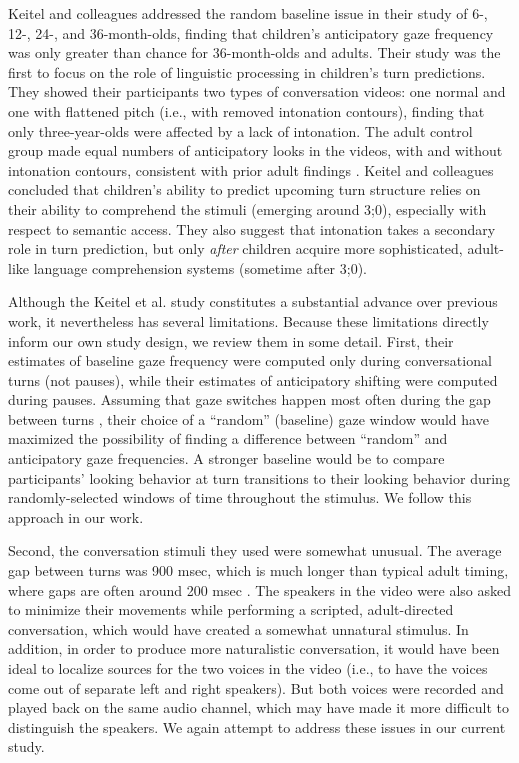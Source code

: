 \documentclass[authoryear, 12pt]{elsarticle}
\begin{document}
Keitel and colleagues \citeyearpar{keitel2013} addressed the random baseline issue in their study of 6-, 12-, 24-, and 36-month-olds, finding that children's anticipatory gaze frequency was only greater than chance for 36-month-olds and adults. Their study was the first to focus on the role of linguistic processing in children's turn predictions. They showed their participants two types of conversation videos: one normal and one with flattened pitch (i.e., with removed intonation contours), finding that only three-year-olds were affected by a lack of intonation. The adult control group made equal numbers of anticipatory looks in the videos, with and without intonation contours, consistent with prior adult findings \citep{de-ruiter2006}. Keitel and colleagues concluded that children's ability to predict upcoming turn structure relies on their ability to comprehend the stimuli (emerging around 3;0), especially with respect to semantic access. They also suggest that intonation takes a secondary role in turn prediction, but only \textit{after} children acquire more sophisticated, adult-like language comprehension systems (sometime after 3;0).

Although the Keitel et al. \citeyearpar{keitel2013} study constitutes a substantial advance over previous work, it nevertheless has several limitations. Because these limitations directly inform our own study design, we review them in some detail. First, their estimates of baseline gaze frequency were computed only during conversational turns (not pauses), while their estimates of anticipatory shifting were computed during pauses. Assuming that gaze switches happen most often during the gap between turns \citep{hirvenkari2013}, their choice of a ``random'' (baseline) gaze window would have maximized the possibility of finding a difference between ``random'' and anticipatory gaze frequencies.
A stronger baseline would be to compare participants' looking behavior at turn transitions to their looking behavior during randomly-selected windows of time throughout the stimulus. We follow this approach in our work. 

Second, the conversation stimuli they used were somewhat unusual. The average gap between turns was 900 msec, which is much longer than typical adult timing, where gaps are often around 200 msec \citep{stivers2009}. The speakers in the video were also asked to minimize their movements while performing a scripted, adult-directed conversation, which would have created a somewhat unnatural stimulus. In addition, in order to produce more naturalistic conversation, it would have been ideal to localize sources for the two voices in the video (i.e., to have the voices come out of separate left and right speakers). But both voices were recorded and played back on the same audio channel, which may have made it more difficult to distinguish the speakers. We again attempt to address these issues in our current study. 
\end{document}
